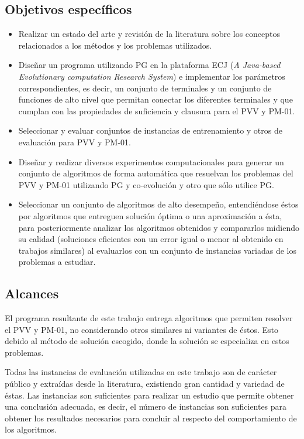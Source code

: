 \subsection{Objetivos específicos}
\begin{itemize}
    \item Realizar un estado del arte y revisión de la literatura sobre los conceptos relacionados a los métodos y los problemas utilizados.
    \item Diseñar un programa utilizando PG en la plataforma ECJ (\textit{A Java-based Evolutionary computation Research System}) e implementar los parámetros correspondientes, es decir, un conjunto de terminales y un conjunto de funciones de alto nivel que permitan conectar los diferentes terminales y que cumplan con las propiedades de suficiencia y clausura para el PVV y PM-01.
    \item Seleccionar y evaluar conjuntos de instancias de entrenamiento y otros de evaluación para PVV y PM-01.
    \item Diseñar y realizar diversos experimentos computacionales para generar un conjunto de algoritmos de forma automática que resuelvan los problemas del PVV y PM-01 utilizando PG y co-evolución y otro que sólo utilice PG.
    \item Seleccionar un conjunto de algoritmos de alto desempeño, entendiéndose éstos por algoritmos que entreguen solución óptima o una aproximación a ésta, para posteriormente analizar los algoritmos obtenidos y compararlos midiendo su calidad (soluciones eficientes con un error igual o menor al obtenido en trabajos similares) al evaluarlos con un conjunto de instancias variadas de los problemas a estudiar.
\end{itemize}


\subsection{Alcances}

El programa resultante de este trabajo entrega algoritmos que permiten resolver el PVV y PM-01, no considerando otros similares ni variantes de éstos. Esto debido al método de solución escogido, donde la solución se especializa en estos problemas.

Todas las instancias de evaluación utilizadas en este trabajo son de carácter público y extraídas desde la literatura, existiendo gran cantidad y variedad de éstas. Las instancias son suficientes para realizar un estudio que permite obtener una conclusión adecuada, es decir, el número de instancias son suficientes para obtener los resultados necesarios para concluir al respecto del comportamiento de los algoritmos.

